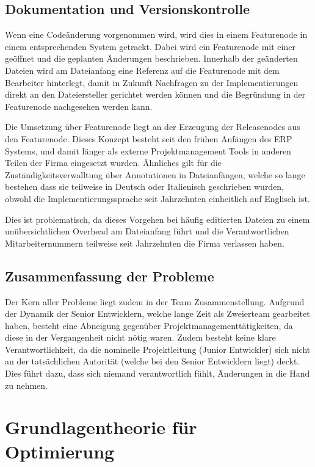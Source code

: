 \subsection{Dokumentation und Versionskontrolle}

Wenn eine Codeänderung vorgenommen wird, wird dies in einem Featurenode in einem entsprechenden System getrackt. Dabei wird ein Featurenode mit einer geöffnet und die geplanten Änderungen beschrieben. Innerhalb der geänderten Dateien wird am Dateianfang eine Referenz auf die Featurenode mit dem Bearbeiter hinterlegt, damit in Zukunft Nachfragen zu der Implementierungen direkt an den Dateiersteller gerichtet werden können und die Begründung in der Featurenode nachgesehen werden kann.

Die Umsetzung über Featurenode liegt an der Erzeugung der Releasenodes aus den Featurenode. Dieses Konzept besteht seit den frühen Anfängen des ERP Systems, und damit länger als externe Projektmanagement Tools in anderen Teilen der Firma eingesetzt wurden. Ähnliches gilt für die Zuständigkeitsverwalltung über Annotationen in Dateianfängen, welche so lange bestehen dass sie teilweise in Deutsch oder Italienisch geschrieben wurden, obwohl die Implementierungssprache seit Jahrzehnten einheitlich auf Englisch ist.

Dies ist problematisch, da dieses Vorgehen bei häufig editierten Dateien zu einem unübersichtlichen Overhead am Dateianfang führt und die Verantwortlichen Mitarbeiternummern teilweise seit Jahrzehnten die Firma verlassen haben.

\subsection{Zusammenfassung der Probleme}

Der Kern aller Probleme liegt zudem in der Team Zusammenstellung. Aufgrund der Dynamik der Senior Entwicklern, welche lange Zeit als Zweierteam gearbeitet haben, besteht eine Abneigung gegenüber Projektmanagementtätigkeiten, da diese in der Vergangenheit nicht nötig waren. Zudem besteht keine klare Verantwortlichkeit, da die nominelle Projektleitung (Junior Entwickler) sich nicht an der tatsächlichen Autorität (welche bei den Senior Entwicklern liegt) deckt. Dies führt dazu, dass sich niemand verantwortlich fühlt, Änderungen in die Hand zu nehmen.



\section{Grundlagentheorie für Optimierung}

